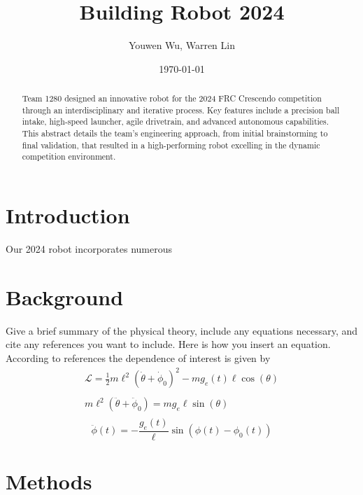 




\title{Building Robot 2024}
\author{Youwen Wu, Warren Lin}
\date{\today}
\maketitle

\begin{abstract}
  Team 1280 designed an innovative robot for the 2024 FRC Crescendo
competition through an interdisciplinary and iterative process. Key
features include a precision ball intake, high-speed launcher, agile
drivetrain, and advanced autonomous capabilities. This abstract details
the team's engineering approach, from initial brainstorming to final
validation, that resulted in a high-performing robot excelling in the
dynamic competition environment.
\end{abstract}


\section{Introduction}

Our 2024 robot incorporates numerous 

\section{Background}

Give a brief summary of the physical theory, include any equations necessary, and cite any references you want to include. Here is how you insert an equation. According to
references the dependence of interest is given
by
\begin{gather*}
  \mathcal{L} =  \frac{1}{2} m \ell^2 {( \dot{\theta}+\dot{\phi}_0)}^2 - m g_e(t) \ell \cos(\theta)\\
  \\
  m\ell^2 (\ddot{\theta} + \ddot{\phi}_0) = mg_e\ell\sin(\theta)\\
\end{gather*}
\begin{equation}
  \ddot{\phi}(t) = -\frac{g_e(t)}{\ell} \sin\left(\phi(t)-\phi_0(t)\right)
  \label{Eq:equation1} %
\end{equation}

\blindtext{} %

\section{Methods}


